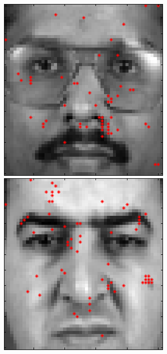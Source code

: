 \documentclass[a4paper,10pt]{article}
\begin{document}
\begin{figure}[ht]
 \includegraphics[width=\textwidth*11/100]{figures/XM2VTS_Full_3.png}
 \includegraphics[width=\textwidth*11/100]{figures/XM2VTS_Full_4.png}

\end{figure}
\end{document}
